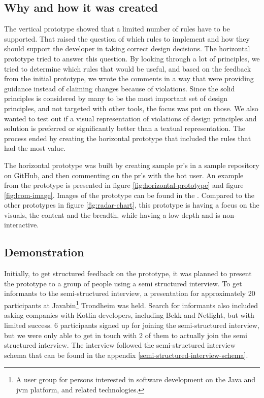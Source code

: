 \documentclass{report}
\begin{document}
\subsection*{Why and how it was created}
The vertical prototype showed that a limited number of rules have to be supported. That raised the question of which rules to implement and how they should support the developer in taking correct design decisions. The horizontal prototype tried to answer this question. By looking through a lot of principles, we tried to determine which rules that would be useful, and based on the feedback from the initial prototype, we wrote the comments in a way that were providing guidance instead of claiming changes because of violations. Since the \gls{solid} principles is considered by many to be the most important set of design principles, and not targeted with other tools, the focus was put on those. We also wanted to test out if a visual representation of violations of design principles and solution is preferred or significantly better than a textual representation. The process ended by creating the horizontal prototype that included the rules that had the most value. 

The horizontal prototype was built by creating sample \gls{pr}'s in a sample repository on GitHub, and then commenting on the \gls{pr}'s with the bot user. An example from the prototype is presented in figure \ref{fig:horizontal-prototype} and figure \ref{fig:lcom-image}. Images of the prototype can be found in the \cite{sample-repository}. Compared to the other prototypes in figure \ref{fig:radar-chart}, this prototype is having a focus on the visuals, the content and the breadth, while having a low depth and is non-interactive.

\subsection*{Demonstration}
Initially, to get structured feedback on the prototype, it was planned to present the prototype to a group of people using a semi structured interview. To get informants to the semi-structured interview, a presentation for approximately 20 participants at Javabin\footnote{A user group for persons interested in software development on the Java and \gls{jvm} platform, and related technologies.} Trondheim was held. Search for informants also included asking companies with Kotlin developers, including Bekk and Netlight, but with limited success. 6 participants signed up for joining the semi-structured interview, but we were only able to get in touch with 2 of them to actually join the semi structured interview. The interview followed the semi-structured interview schema that can be found in the appendix \ref{semi-structured-interview-schema}.
\end{document}
